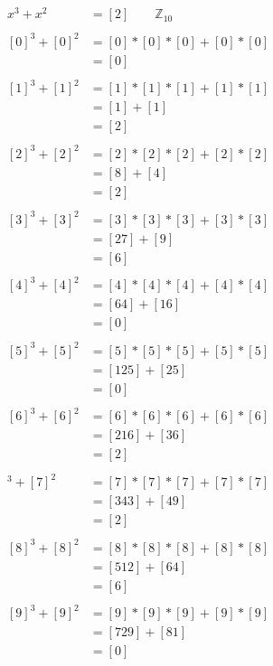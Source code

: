 \documentclass{article}
\begin{document}
\begin{enumerate}
			\begin{align*}
				x^3 + x^2 & = [2] \qquad \mathbb{Z}_10 \\
				& \\
				[0]^3 + [0]^2 & = [0] * [0] * [0] + [0] * [0] \\
							  & = [0] \\
							  & \\
				[1]^3 + [1]^2 & = [1] * [1] * [1] + [1] * [1] \\
							  & = [1] + [1] \\
							  & = [2] \\
							  & \\
				[2]^3 + [2]^2 & = [2] * [2] * [2] + [2] * [2] \\
							  & = [8] + [4] \\
							  & = [2] \\ 
							  & \\
				[3]^3 + [3]^2 & = [3] * [3] * [3] + [3] * [3] \\
							  & = [27] + [9] \\
							  & = [6] \\ 
							  & \\
				[4]^3 + [4]^2 & = [4] * [4] * [4] + [4] * [4] \\
							  & = [64] + [16] \\
							  & = [0] \\
							  & \\
				[5]^3 + [5]^2 & = [5] * [5] * [5] + [5] * [5] \\
							  & = [125] + [25] \\
							  & = [0] \\
							  & \\
  				[6]^3 + [6]^2 & = [6] * [6] * [6] + [6] * [6] \\
							  & = [216] + [36] \\
							  & = [2] \\
			\end{align*}
			\begin{align*}
				[7]^3 + [7]^2 & = [7] * [7] * [7] + [7] * [7] \\
							  & = [343] + [49] \\
							  & = [2] \\
							  & \\
				[8]^3 + [8]^2 & = [8] * [8] * [8] + [8] * [8] \\
							  & = [512] + [64] \\
							  & = [6] \\
							  & \\
				[9]^3 + [9]^2 & = [9] * [9] * [9] + [9] * [9] \\
							  & = [729] + [81] \\
							  & = [0]
  			\end{align*}


\end{enumerate}
\end{document}
